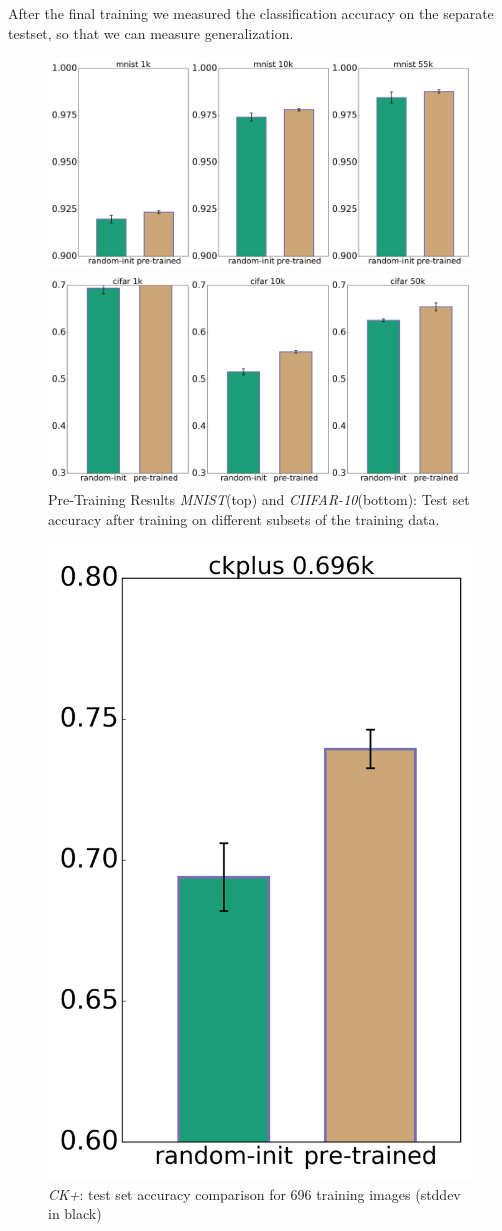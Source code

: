 \documentclass{article}
\begin{document}
    After the final training we measured the classification accuracy on the separate testset, so that we can measure generalization.
    \begin{figure}
      \centering

      \includegraphics[width=.8\linewidth]{../box_plots/boxplots_mnist.png}

      \includegraphics[width=.8\linewidth]{../box_plots/boxplots_cifar.png}

      \caption{Pre-Training Results \emph{MNIST}(top) and \emph{CIIFAR-10}(bottom): Test set accuracy after training on different subsets of the training data.}
      \label{fig:mnist_cifar_plot}
    \end{figure}


    \begin{figure}
      \centering
      \includegraphics[width=0.33\linewidth]{../box_plots/boxplots_ckplus.png}
      \caption{\emph{CK+}: test set accuracy comparison for 696 training images (stddev in black)}
      \label{fig:ckplus_plot}
    \end{figure}
\end{document}
